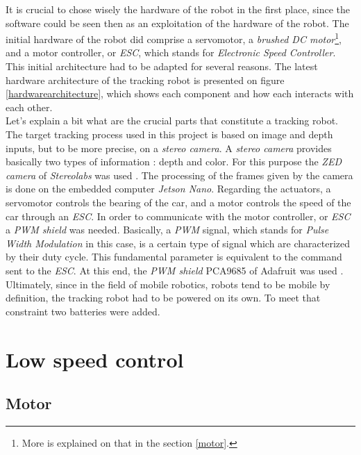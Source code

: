 		
		It is crucial to chose wisely the hardware of the robot in the first place, since
		the software could be seen then as an exploitation of the hardware of 
		the robot. The initial hardware of the robot did comprise
		a servomotor, a \textit{brushed DC motor}\footnote{More is explained 
		on that in the section \vref{motor}.}, and a motor controller, or \textit{ESC}, which
		stands for \textit{ Electronic Speed Controller}.
		\\\indent This initial architecture had to be adapted for several reasons.
		The latest hardware architecture of the tracking robot is
		presented on figure \vref{hardwarearchitecture}, which
		shows each component and how each interacts with each other.
		\\\indent Let's explain a bit what are the crucial parts
		that constitute a tracking robot. The target tracking process used
		in this project is based on image and depth inputs, but to be more
		precise, on a \textit{stereo camera}. A \textit{stereo camera}
		provides basically two types of information : depth and color.
		For this purpose the \textit{ZED camera} of \textit{Stereolabs}
		was used \cite{zeddoc}. The processing of the frames
		given by the camera is done on the embedded computer
		\textit{Jetson Nano}. Regarding the actuators, a servomotor
		controls the bearing of the car, and a motor controls the speed
		of the car through an \textit{ESC}. In order to communicate
		with the motor controller, or \textit{ESC} a \textit{PWM shield}
		was needed. Basically, a \textit{PWM} signal, which stands for
		\textit{Pulse Width Modulation} in this case, is a certain type
		of signal which are characterized by their duty cycle. This 
		fundamental parameter is equivalent to the command sent 
		to the \textit{ESC}. At this end, the \textit{PWM shield} PCA9685
		of Adafruit was used \cite{adafruitpwm}. Ultimately, since
		in the field of mobile robotics, robots tend to be mobile by definition,
		the tracking robot had to be powered on its own. To 
		meet that constraint two batteries were added.
		
		\begin{figure}
			\label{hardwarearchitecture}
		\end{figure}

	\section{Low speed control}\label{motor}
	
		\subsection{Motor}
		
